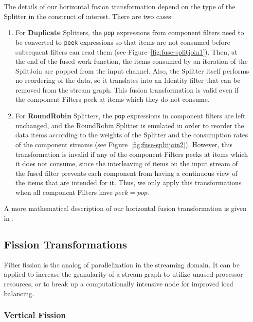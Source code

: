The details of our horizontal fusion transformation depend on the type
of the Splitter in the construct of interest.  There are two cases:
\begin{enumerate}
\item For {\bf Duplicate} Splitters, the {\tt pop} expressions from
component filters need to be converted to {\tt peek} expressions so
that items are not consumed before subsequent filters can read them
(see Figure~\ref{fig:fuse-splitjoin1}).  Then, at the end of the fused
work function, the items consumed by an iteration of the SplitJoin are
popped from the input channel.  Also, the Splitter itself performs no
reordering of the data, so it translates into an Identity filter that
can be removed from the stream graph.  This fusion transformation is
valid even if the component Filters peek at items which they do not
consume.

\item For {\bf RoundRobin} Splitters, the {\tt pop} expressions in
component filters are left unchanged, and the RoundRobin Splitter is
emulated in order to reorder the data items according to the weights
of the Splitter and the consumption rates of the component streams
(see Figure~\ref{fig:fuse-splitjoin2}).  However, this transformation
is invalid if any of the component Filters peeks at items which it
does not consume, since the interleaving of items on the input stream
of the fused filter prevents each component from having a continuous
view of the items that are intended for it.  Thus, we only apply this
transformations when all component Filters have $peek = pop$.
\end{enumerate}

A more mathematical description of our horizontal fusion
transformation is given in \cite{streamittech2}.

\subsection{Fission Transformations}

Filter fission is the analog of parallelization in the streaming
domain.  It can be applied to increase the granularity of a stream
graph to utilize unused processor resources, or to break up a
computationally intensive node for improved load balancing.

\subsubsection{Vertical Fission}

